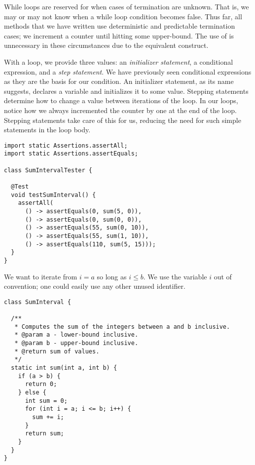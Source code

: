 While loops are reserved for when cases of termination are unknown. That is, we may or may not know when a while loop condition becomes false. Thus far, all methods that we have written use deterministic and predictable termination cases; we increment a counter until hitting some upper-bound. The use of  is unnecessary in these circumstances due to the equivalent  construct.

With a  loop, we provide three values: an \emph{initializer statement}, a conditional expression, and a \emph{step statement}. We have previously seen conditional expressions as they are the basis for our  condition. An initializer statement, as its name suggests, declares a variable and initializes it to some value. Stepping statements determine how to change a value between iterations of the loop. In our  loops, notice how we always incremented the counter by one at the end of the loop. Stepping statements take care of this for us, reducing the need for such simple statements in the loop body.


\begin{lstlisting}[language=MyJava]
import static Assertions.assertAll;
import static Assertions.assertEquals;

class SumIntervalTester {

  @Test
  void testSumInterval() {
    assertAll(
      () -> assertEquals(0, sum(5, 0)),
      () -> assertEquals(0, sum(0, 0)),
      () -> assertEquals(55, sum(0, 10)),
      () -> assertEquals(55, sum(1, 10)),
      () -> assertEquals(110, sum(5, 15)));
  }
}
\end{lstlisting}

We want to iterate from $i = a$ so long as $i \leq b$. We use the variable $i$ out of convention; one could easily use any other unused identifier.

\begin{lstlisting}[language=MyJava]
class SumInterval {

  /**
   * Computes the sum of the integers between a and b inclusive.
   * @param a - lower-bound inclusive.
   * @param b - upper-bound inclusive.
   * @return sum of values.
   */
  static int sum(int a, int b) {
    if (a > b) { 
      return 0; 
    } else {
      int sum = 0;
      for (int i = a; i <= b; i++) { 
        sum += i; 
      }
      return sum;
    }
  }
}
\end{lstlisting}


